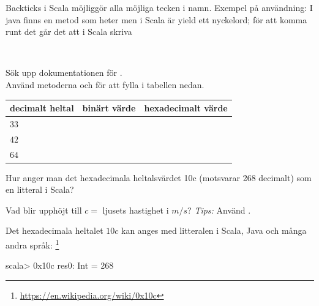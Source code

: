 \SubtaskSolved Backticks i Scala möjliggör alla möjliga tecken i namn. Exempel på användning: I java finns en metod som heter  men i Scala är yield ett nyckelord; för att komma runt det går det att i Scala skriva 

\QUESTEND













\QUESTBEGIN

\Task\Uberkurs \what~

\Subtask Sök upp dokumentationen för .\\Använd metoderna  och  för att fylla i tabellen nedan.

\begin{table}[H]
\begin{tabular}{l | l | l}
decimalt heltal & binärt värde & hexadecimalt värde \\
\hline
$33$ &   &  \\
$42$ &   &  \\
$64$ &   &  \\
\end{tabular}
\end{table}

\Subtask Hur anger man det hexadecimala heltalsvärdet 10c (motsvarar 268 decimalt) som en litteral i Scala?

\Subtask Vad blir  upphöjt till $c =$ ljusets hastighet i $m/s$? \emph{Tips:} Använd .

\SOLUTION

\TaskSolved \what

\SubtaskSolved



\SubtaskSolved Det hexadecimala heltalet $10c$ kan anges med litteralen  i Scala, Java och många andra språk: \footnote{\url{https://en.wikipedia.org/wiki/0x10c}}
\begin{REPL}
scala> 0x10c
res0: Int = 268
\end{REPL}

